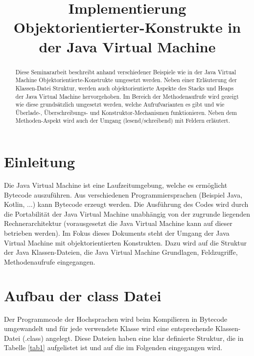 \documentclass[conference]{IEEEtran}
\begin{document}
\title{Implementierung Objektorientierter-Konstrukte in der Java Virtual Machine\\}

\author{
}

\maketitle

\begin{abstract}
Diese Seminararbeit beschreibt anhand verschiedener Beispiele wie in der Java Virtual Machine Objektorientierte-Konstrukte umgesetzt werden. Neben einer Erläuterung der Klassen-Datei Struktur, werden auch objektorientierte Aspekte des Stacks und Heaps der Java Virtual Machine hervorgehoben. Im Bereich der Methodenaufrufe wird gezeigt wie diese grundsätzlich umgesetzt werden, welche Aufrufvarianten es gibt und wie Überlade-, Überschreibungs- und Konstruktor-Mechanismen funktionieren. Neben dem Methoden-Aspekt wird auch der Umgang (lesend/schreibend) mit Feldern erläutert.
\end{abstract}

\section{Einleitung}
Die Java Virtual Machine ist eine Laufzeitumgebung, welche es ermöglicht Bytecode auszuführen. Aus verschiedenen Programmiersprachen (Beispiel Java, Kotlin, ...) kann  Bytecode erzeugt werden. Die Ausführung des Codes wird durch die Portabilität der Java Virtual Machine unabhängig von der zugrunde liegenden Rechnerarchitektur (vorausgesetzt die Java Virtual Machine kann auf dieser betrieben werden). Im Fokus dieses Dokuments steht der Umgang der Java Virtual Machine mit objektorientierten Konstrukten. Dazu wird auf die Struktur der Java Klassen-Dateien, die Java Virtual Machine Grundlagen, Feldzugriffe, Methodenaufrufe eingegangen.

\section{Aufbau der class Datei}
\label{chKlassenDatei}
Der Programmcode der Hochsprachen wird beim Kompilieren in Bytecode umgewandelt und für jede verwendete Klasse wird eine entsprechende Klassen-Datei (.class) angelegt. Diese Dateien haben eine klar definierte Struktur, die in Tabelle \ref{tab1} aufgelistet ist und auf die im Folgenden eingegangen wird.
\end{document}

